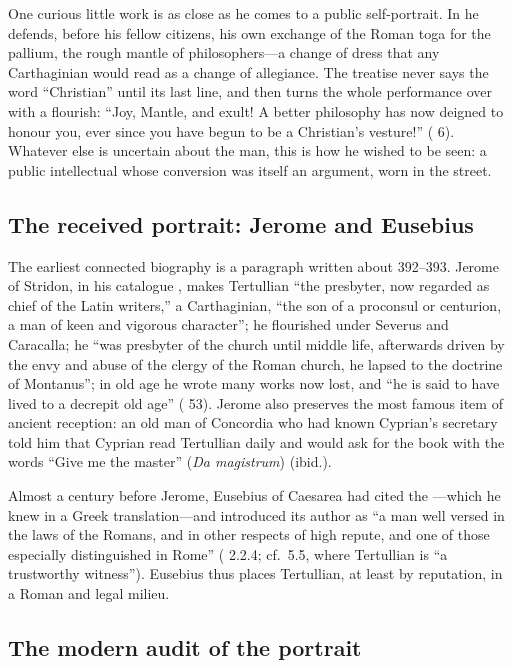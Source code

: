 One curious little work is as close as he comes to a public self-portrait. In
 he defends, before his fellow citizens, his own exchange
of the Roman toga for the pallium, the rough mantle of philosophers---a change
of dress that any Carthaginian would read as a change of allegiance. The
treatise never says the word ``Christian'' until its last line, and then turns
the whole performance over with a flourish: ``Joy, Mantle, and exult! A better
philosophy has now deigned to honour you, ever since you have begun to be a
Christian's vesture!'' ( 6). Whatever else is uncertain
about the man, this is how he wished to be seen: a public intellectual whose
conversion was itself an argument, worn in the street.

\subsection{The received portrait: Jerome and Eusebius}

The earliest connected biography is a paragraph written about 392--393. Jerome
of Stridon, in his catalogue , makes Tertullian ``the
presbyter, now regarded as chief of the Latin writers,'' a Carthaginian, ``the
son of a proconsul or centurion, a man of keen and vigorous character''; he
flourished under Severus and Caracalla; he ``was presbyter of the church until
middle life, afterwards driven by the envy and abuse of the clergy of the Roman
church, he lapsed to the doctrine of Montanus''; in old age he wrote many works
now lost, and ``he is said to have lived to a decrepit old age'' ( 53). Jerome also preserves the most famous item of ancient
reception: an old man of Concordia who had known Cyprian's secretary told him
that Cyprian read Tertullian daily and would ask for the book with the words
``Give me the master'' (\textit{Da magistrum}) (ibid.).

Almost a century before Jerome, Eusebius of Caesarea had cited the
---which he knew in a Greek translation---and introduced its
author as ``a man well versed in the laws of the Romans, and in other respects
of high repute, and one of those especially distinguished in Rome''
( 2.2.4; cf.\ 5.5, where Tertullian is ``a trustworthy
witness''). Eusebius thus places Tertullian, at least by reputation, in a Roman
and legal milieu.

\subsection{The modern audit of the portrait}


